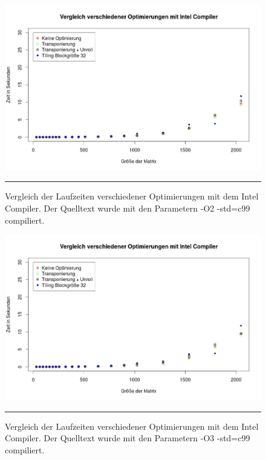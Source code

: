 \begin{figure}[h]
\includegraphics[scale = 0.45]{Bilder/iccO2.png}
\caption{Vergleich der Laufzeiten verschiedener Optimierungen mit dem Intel Compiler. Der Quelltext wurde mit den Parametern -O2 -std=c99 compiliert.}
\noindent\rule{14cm}{0.4pt}
\label{iccO2}
\end{figure}

\begin{figure}[h]
\includegraphics[scale = 0.45]{Bilder/iccO3.png}
\caption{Vergleich der Laufzeiten verschiedener Optimierungen mit dem Intel Compiler. Der Quelltext wurde mit den Parametern -O3 -std=c99 compiliert.}
\noindent\rule{14cm}{0.4pt}
\label{iccO3}
\end{figure}

